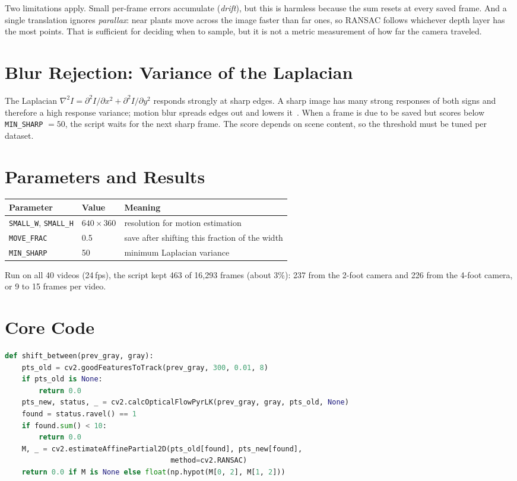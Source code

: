 \documentclass[11pt]{article}
\begin{document}
Two limitations apply. Small per-frame errors accumulate (\emph{drift}), but
this is harmless because the sum resets at every saved frame. And a single
translation ignores \emph{parallax}: near plants move across the image faster
than far ones, so RANSAC follows whichever depth layer has the most points.
That is sufficient for deciding when to sample, but it is not a metric
measurement of how far the camera traveled.

\section{Blur Rejection: Variance of the Laplacian}
The Laplacian $\nabla^2 I = \partial^2 I/\partial x^2 + \partial^2 I/\partial y^2$
responds strongly at sharp edges. A sharp image has many strong responses of
both signs and therefore a high response variance; motion blur spreads edges
out and lowers it~\cite{pech2000}. When a frame is due to be saved but scores
below \texttt{MIN\_SHARP} $=50$, the script waits for the next sharp frame.
The score depends on scene content, so the threshold must be tuned per
dataset.

\section{Parameters and Results}
\begin{center}
\begin{tabular}{lll}
\toprule
Parameter & Value & Meaning \\
\midrule
\texttt{SMALL\_W}, \texttt{SMALL\_H} & $640\times360$ & resolution for motion estimation \\
\texttt{MOVE\_FRAC} & 0.5 & save after shifting this fraction of the width \\
\texttt{MIN\_SHARP} & 50 & minimum Laplacian variance \\
\bottomrule
\end{tabular}
\end{center}

Run on all 40 videos (24\,fps), the script kept 463 of 16{,}293 frames
(about 3\%): 237 from the 2-foot camera and 226 from the 4-foot camera, or 9
to 15 frames per video.

\section{Core Code}
\begin{lstlisting}[language=Python]
def shift_between(prev_gray, gray):
    pts_old = cv2.goodFeaturesToTrack(prev_gray, 300, 0.01, 8)
    if pts_old is None:
        return 0.0
    pts_new, status, _ = cv2.calcOpticalFlowPyrLK(prev_gray, gray, pts_old, None)
    found = status.ravel() == 1
    if found.sum() < 10:
        return 0.0
    M, _ = cv2.estimateAffinePartial2D(pts_old[found], pts_new[found],
                                       method=cv2.RANSAC)
    return 0.0 if M is None else float(np.hypot(M[0, 2], M[1, 2]))
\end{lstlisting}
\end{document}
